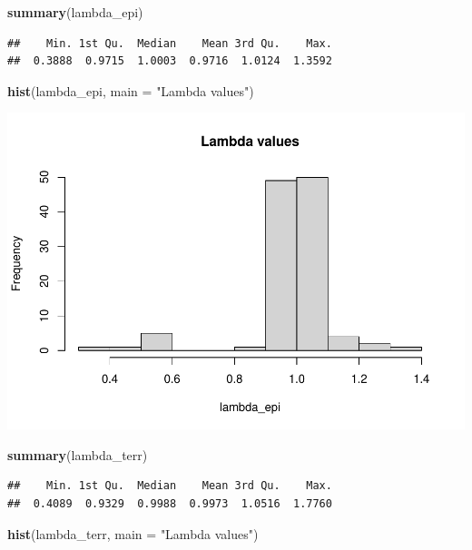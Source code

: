 \documentclass[
]{book}
\newenvironment{Shaded}{\begin{snugshade}}{\end{snugshade}}
\newcommand{\AttributeTok}[1]{\textcolor[rgb]{0.13,0.29,0.53}{#1}}
\newcommand{\FunctionTok}[1]{\textcolor[rgb]{0.13,0.29,0.53}{\textbf{#1}}}
\newcommand{\NormalTok}[1]{#1}
\newcommand{\StringTok}[1]{\textcolor[rgb]{0.31,0.60,0.02}{#1}}
\theoremstyle{definition}
\theoremstyle{definition}
\theoremstyle{definition}
\theoremstyle{definition}
\theoremstyle{remark}
\begin{document}
\begin{Shaded}
\begin{Highlighting}[]
\FunctionTok{summary}\NormalTok{(lambda\_epi)}
\end{Highlighting}
\end{Shaded}

\begin{verbatim}
##    Min. 1st Qu.  Median    Mean 3rd Qu.    Max. 
##  0.3888  0.9715  1.0003  0.9716  1.0124  1.3592
\end{verbatim}

\begin{Shaded}
\begin{Highlighting}[]
\FunctionTok{hist}\NormalTok{(lambda\_epi, }\AttributeTok{main =} \StringTok{"Lambda values"}\NormalTok{)}
\end{Highlighting}
\end{Shaded}

\includegraphics{Diagnostico_Poblacional_files/figure-latex/chap16_21-1.pdf}

\begin{Shaded}
\begin{Highlighting}[]
\FunctionTok{summary}\NormalTok{(lambda\_terr)}
\end{Highlighting}
\end{Shaded}

\begin{verbatim}
##    Min. 1st Qu.  Median    Mean 3rd Qu.    Max. 
##  0.4089  0.9329  0.9988  0.9973  1.0516  1.7760
\end{verbatim}

\begin{Shaded}
\begin{Highlighting}[]
\FunctionTok{hist}\NormalTok{(lambda\_terr, }\AttributeTok{main =} \StringTok{"Lambda values"}\NormalTok{)}
\end{Highlighting}
\end{Shaded}
\end{document}
